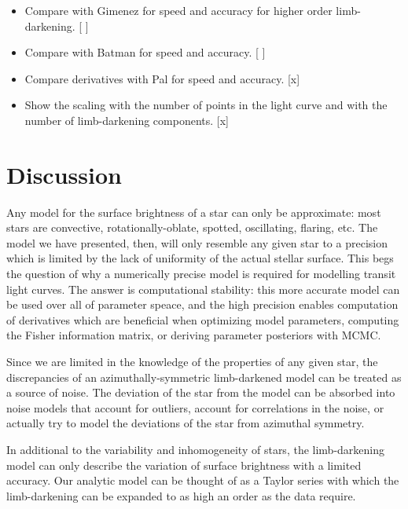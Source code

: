 \documentclass[modern]{aastex61}
\begin{document}
\begin{itemize}
\item Compare with Gimenez for speed and accuracy for higher order limb-darkening. [ ]
\item Compare with Batman for speed and accuracy. [ ]
\item Compare derivatives with Pal for speed and accuracy. [x]
\item Show the scaling with the number of points in the light curve
and with the number of limb-darkening components. [x]
\end{itemize}

\section{Discussion}

Any model for the surface brightness of a star can only be approximate:  most stars 
are convective, rotationally-oblate, spotted, oscillating, flaring, etc.  The
model we have presented, then, will only resemble any given star to
a precision which is limited by the lack of uniformity of the actual stellar surface.
This begs the question of why a numerically precise model is required for
modelling transit light curves.  The answer is computational stability:
this more accurate model can be used over all of parameter speace, and the
high precision enables computation of derivatives which are beneficial when
optimizing model parameters, computing the Fisher information matrix, or
deriving parameter posteriors with MCMC.

Since we are limited in the knowledge of the properties of any given star, 
the discrepancies of an azimuthally-symmetric limb-darkened model can be 
treated as a source of noise.
The deviation of the star from the model can be absorbed into noise models that 
account for outliers, account for correlations in the noise, or actually
try to model the deviations of the star from azimuthal symmetry.

In additional to the variability and inhomogeneity of stars, the limb-darkening model
can only describe the variation of surface brightness with a limited accuracy.
Our analytic model can be thought of as a Taylor series with which the
limb-darkening can be expanded to as high an order as the data require.
\end{document}
